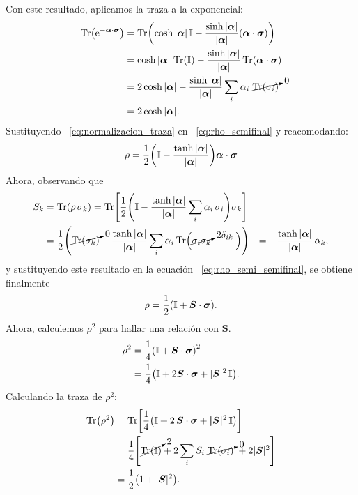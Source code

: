 \documentclass[../Main.tex]{subfiles}
\begin{document}
Con este resultado, aplicamos la traza a la exponencial:
\begin{align}
\Tr\!\qty(\mathrm{e}^{-\bm{\alpha}\cdot\bm{\sigma}})
&=
\Tr\!\qty(
\cosh|\bm{\alpha}|\,\mathbb{I}
-
\frac{\sinh|\bm{\alpha}|}{|\bm{\alpha}|}
(\bm{\alpha}\cdot\bm{\sigma})
)
\notag \\
&=
\cosh|\bm{\alpha}|\,\Tr(\mathbb{I})
-
\frac{\sinh|\bm{\alpha}|}{|\bm{\alpha}|}
\Tr(\bm{\alpha}\cdot\bm{\sigma})
\notag \\
&=
2\cosh|\bm{\alpha}|
-
\frac{\sinh|\bm{\alpha}|}{|\bm{\alpha}|}
\sum_i \alpha_i\; \cancelto{0}{\Tr(\sigma_i)}
\notag \\
&=
2\cosh|\bm{\alpha}|.
\label{eq:normalizacion_traza}
\end{align}
Sustituyendo ~\eqref{eq:normalizacion_traza} en ~\eqref{eq:rho_semifinal} y reacomodando:
\begin{equation}
    \rho = \frac{1}{2}\qty(\mathbb{I} - \frac{\tanh{|\bm{\alpha}|}}{|\bm{\alpha}|})\bm{\alpha}\cdot\bm{\sigma}
    \label{eq:rho_semi_semifinal}
\end{equation}
Ahora, observando que
\begin{align}
    S_k 
    &= \Tr(\rho\,\sigma_k)
    = \Tr\!\qty[\frac{1}{2}\qty(\mathbb{I} - \frac{\tanh |\bm{\alpha}|}{|\bm{\alpha}|}\sum_i \alpha_i\,\sigma_i )\sigma_k]
    \notag \\
    &= \frac{1}{2}\qty(\cancelto{0}{\Tr(\sigma_k)}
    - \frac{\tanh |\bm{\alpha}|}{|\bm{\alpha}|}
    \sum_i \alpha_i \Tr(\cancelto{2\delta_{ik}}{\sigma_i\sigma_k}\hspace{.9cm}))
    &= -\frac{\tanh |\bm{\alpha}|}{|\bm{\alpha}|}\,\alpha_k ,
\end{align}
y sustituyendo este resultado en la ecuación ~\eqref{eq:rho_semi_semifinal}, se obtiene finalmente
\begin{equation}
\rho = \frac{1}{2}\qty(\mathbb{I} + \bm{S}\cdot \bm{\sigma}).
\label{eq:rho_final}
\end{equation}
Ahora, calculemos $\rho^2$ para hallar una relación con $\bm{S}$.
\begin{align*}
    \rho^2&=
    \frac{1}{4}\qty(\mathbb{I} + \bm{S}\cdot \bm{\sigma})^2
    \notag \\
    &=\frac{1}{4}\qty(\mathbb{I}+2\bm{S}\cdot\bm{\sigma}+|\bm{S}|^2\,\mathbb{I}).
\end{align*}
Calculando la traza de $\rho^2$:
\begin{align}
    \Tr(\rho^2)&=
    \Tr[\frac{1}{4}\qty(\mathbb{I}+2\,\bm{S}\cdot\bm{\sigma}+\bm{|S|}^2\,\mathbb{I})]
    \notag \\
    &= \frac{1}{4}\qty[\cancelto{2}{\Tr(\mathbb{I})}+2\sum_iS_i\;\cancelto{0}{\Tr(\sigma_i)}\;+2|\bm{S}|^2]
    \notag \\
    &=\frac{1}{2}\qty(1+|\bm{S}|^2).
\end{align}
\end{document}
